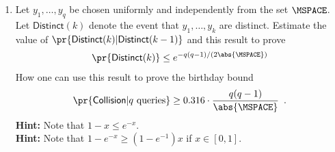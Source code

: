 \documentclass{article}
\begin{document}
\begin{enumerate}
   

\item Let $y_1,\ldots,y_q$ be chosen uniformly and independently from
  the set $\MSPACE$. Let $\mathsf{Distinct}(k)$ denote the event that
  $y_1,\ldots,y_k$ are distinct. Estimate the value of
  $\pr{\mathsf{Distinct}(k)|\mathsf{Distinct}(k-1)}$ and this result
  to prove
  \begin{align*}
    \pr{\mathsf{Distinct}(k)}\leq e^{-q(q-1)/(2\abs{\MSPACE})}
  \end{align*}
   How one can use this result to prove the birthday bound
   \begin{align*}
     \pr{\mathsf{Collision}|q \text{ queries}}\geq 0.316\cdot
     \frac{q(q-1)}{\abs{\MSPACE}}\enspace.
   \end{align*}
  \textbf{Hint:} Note that $1-x\leq e^{-x}$. \\
  \textbf{Hint:} Note that $1-e^{-x}\geq (1-e^{-1})x$ if $x\in[0,1]$.


\end{enumerate}
\end{document}
